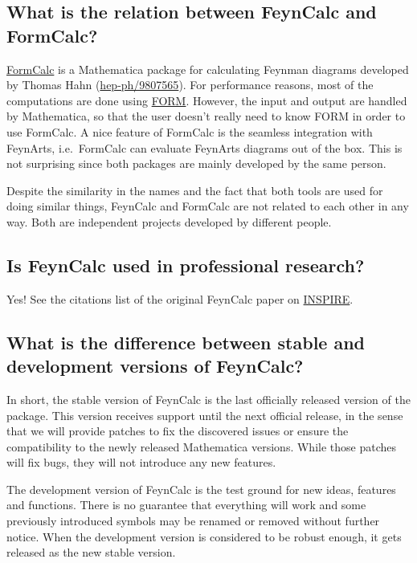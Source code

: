\documentclass[../FeynCalcManual.tex]{subfiles}
\begin{document}
\subsection{What is the relation between FeynCalc and
FormCalc?}\label{what-is-the-relation-between-feyncalc-and-formcalc}

\href{http://www.feynarts.de/formcalc/}{FormCalc} is a Mathematica
package for calculating Feynman diagrams developed by Thomas Hahn
(\href{http://arxiv.org/abs/hep-ph/9807565}{hep-ph/9807565}). For
performance reasons, most of the computations are done using
\href{http://www.nikhef.nl/~form/}{FORM}. However, the input and output
are handled by Mathematica, so that the user doesn't really need to know
FORM in order to use FormCalc. A nice feature of FormCalc is the
seamless integration with FeynArts, i.e.~FormCalc can evaluate FeynArts
diagrams out of the box. This is not surprising since both packages are
mainly developed by the same person.

Despite the similarity in the names and the fact that both tools are
used for doing similar things, FeynCalc and FormCalc are not related to
each other in any way. Both are independent projects developed by
different people.

\subsection{Is FeynCalc used in professional
research?}\label{is-feyncalc-used-in-professional-research}

Yes! See the citations list of the original FeynCalc paper on
\href{http://inspirehep.net/record/28757/citations?ln=en}{INSPIRE}.

\subsection{What is the difference between stable and development
versions of
FeynCalc?}\label{what-is-the-difference-between-stable-and-development-versions-of-feyncalc}

In short, the stable version of FeynCalc is the last officially released
version of the package. This version receives support until the next
official release, in the sense that we will provide patches to fix the
discovered issues or ensure the compatibility to the newly released
Mathematica versions. While those patches will fix bugs, they will not
introduce any new features.

The development version of FeynCalc is the test ground for new ideas,
features and functions. There is no guarantee that everything will work
and some previously introduced symbols may be renamed or removed without
further notice. When the development version is considered to be robust
enough, it gets released as the new stable version.
\end{document}
